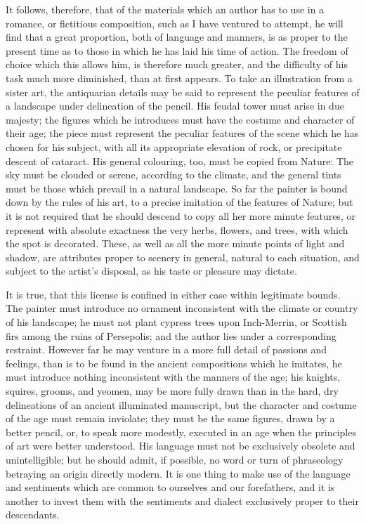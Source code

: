 It follows, therefore, that of the materials which an author has to use
in a romance, or fictitious composition, such as I have ventured to
attempt, he will find that a great proportion, both of language and
manners, is as proper to the present time as to those in which he has
laid his time of action. The freedom of choice which this allows him, is
therefore much greater, and the difficulty of his task much more
diminished, than at first appears. To take an illustration from a sister
art, the antiquarian details may be said to represent the peculiar
features of a landscape under delineation of the pencil. His feudal
tower must arise in due majesty; the figures which he introduces must
have the costume and character of their age; the piece must represent
the peculiar features of the scene which he has chosen for his subject,
with all its appropriate elevation of rock, or precipitate descent of
cataract. His general colouring, too, must be copied from Nature: The
sky must be clouded or serene, according to the climate, and the general
tints must be those which prevail in a natural landscape. So far the
painter is bound down by the rules of his art, to a precise imitation of
the features of Nature; but it is not required that he should descend to
copy all her more minute features, or represent with absolute exactness
the very herbs, flowers, and trees, with which the spot is decorated.
These, as well as all the more minute points of light and shadow, are
attributes proper to scenery in general, natural to each situation, and
subject to the artist's disposal, as his taste or pleasure may dictate.

It is true, that this license is confined in either case within
legitimate bounds. The painter must introduce no ornament inconsistent
with the climate or country of his landscape; he must not plant cypress
trees upon Inch-Merrin, or Scottish firs among the ruins of Persepolis;
and the author lies under a corresponding restraint. However far he may
venture in a more full detail of passions and feelings, than is to be
found in the ancient compositions which he imitates, he must introduce
nothing inconsistent with the manners of the age; his knights, squires,
grooms, and yeomen, may be more fully drawn than in the hard, dry
delineations of an ancient illuminated manuscript, but the character and
costume of the age must remain inviolate; they must be the same figures,
drawn by a better pencil, or, to speak more modestly, executed in an age
when the principles of art were better understood. His language must not
be exclusively obsolete and unintelligible; but he should admit, if
possible, no word or turn of phraseology betraying an origin directly
modern. It is one thing to make use of the language and sentiments which
are common to ourselves and our forefathers, and it is another to invest
them with the sentiments and dialect exclusively proper to their
descendants.

